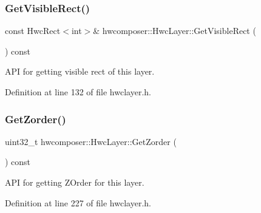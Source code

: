\subsubsection{\texorpdfstring{Get\+Visible\+Rect()}{GetVisibleRect()}}
{\footnotesize\ttfamily const Hwc\+Rect$<$int$>$\& hwcomposer\+::\+Hwc\+Layer\+::\+Get\+Visible\+Rect (\begin{DoxyParamCaption}{ }\end{DoxyParamCaption}) const\hspace{0.3cm}{\ttfamily [inline]}}

A\+PI for getting visible rect of this layer. 

Definition at line 132 of file hwclayer.\+h.


\begin{DoxyCode}{0}
\end{DoxyCode}
\mbox{\label{structhwcomposer_1_1HwcLayer_a66c6767ed9f3df9daf20ed8439d34eaf}} 
\subsubsection{\texorpdfstring{Get\+Zorder()}{GetZorder()}}
{\footnotesize\ttfamily uint32\+\_\+t hwcomposer\+::\+Hwc\+Layer\+::\+Get\+Zorder (\begin{DoxyParamCaption}{ }\end{DoxyParamCaption}) const\hspace{0.3cm}{\ttfamily [inline]}}

A\+PI for getting Z\+Order for this layer. 

Definition at line 227 of file hwclayer.\+h.


\begin{DoxyCode}{0}
\end{DoxyCode}
\mbox{\label{structhwcomposer_1_1HwcLayer_a9d448b96cbef38c1f174f17d43a49c6b}} 
